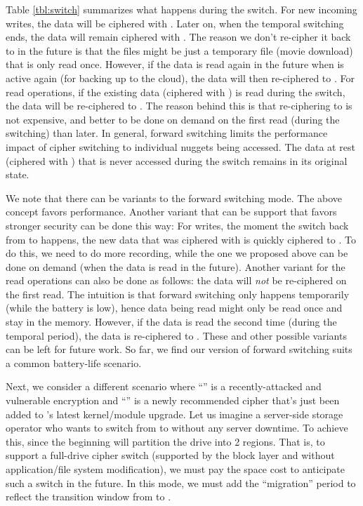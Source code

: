 Table \cref{tbl:switch} summarizes what happens during the switch. For new
incoming writes, the data will be ciphered with \ctwo. Later on, when the
temporal switching ends, the data will remain ciphered with \ctwo
{}. The reason we don't re-cipher it back to \cone in the future is
that the files might be just a temporary file (\eg movie download) that is only
read once. However, if the data is read again in the future when \cone is active
again (\eg for backing up to the cloud), the data will then re-ciphered to
\cone. For read operations, if the existing data (ciphered with \cone) is read
during the switch, the data will be re-ciphered to \ctwo. The reason behind this
is that re-ciphering to \ctwo is not expensive, and better to be done on demand
on the first read (during the switching) than later. In general, forward
switching limits the performance impact of cipher switching to individual
nuggets being accessed. The data at rest (ciphered with \cone) that is never
accessed during the switch remains in its original state.

We note that there can be variants to the forward switching mode. The above
concept favors performance. Another variant that can be support that favors
stronger security can be done this way: For writes, the moment the switch back
from \ctwo to \cone happens, the new data that was ciphered with \ctwo is
quickly ciphered to \cone. To do this, we need to do more recording, while the
one we proposed above can be done on demand (when the data is read in the
future). Another variant for the read operations can also be done as follows:
the data will {\em not} be re-ciphered on the first read. The intuition is that
forward switching only happens temporarily (while the battery is low), hence
data being read might only be read once and stay in the memory. However, if the
data is read the second time (during the temporal period), the data is
re-ciphered to \ctwo. These and other possible variants can be left for future
work. So far, we find our version of forward switching suits a common
battery-life scenario.



 Next, we consider a different scenario where
``\cone'' is a recently-attacked and vulnerable encryption and ``\ctwo'' is a
newly recommended cipher that's just been added to \sys's latest kernel/module
upgrade. Let us imagine a server-side storage operator who wants to switch from
\cone to \ctwo without any server downtime. To achieve this, \sys since the
beginning will partition the drive into 2 regions. That is, to support a
full-drive cipher switch (supported by the block layer and without
application/file system modification), we must pay the space cost to anticipate
such a switch in the future. In this mode, we must add the ``migration'' period
to reflect the transition window from \cone to \ctwo.

